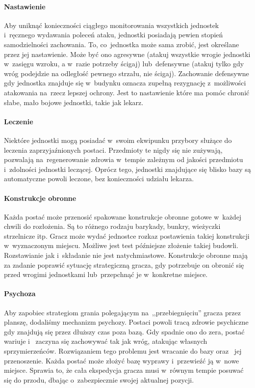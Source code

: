 \documentclass[licencjacka]{pracamgr}
\begin{document}
      \paragraph{Nastawienie}
	Aby uniknąć konieczności ciągłego monitorowania wszystkich jednostek i~ręcznego wydawania poleceń ataku, jednostki posiadają pewien
	stopień samodzielności zachowania. To, co~jednostka może sama zrobić, jest określane przez jej nastawienie. Może być ono agresywne
	(atakuj wszystkie wrogie jednostki w~zasięgu wzroku, a w~razie potrzeby ścigaj) lub~defensywne (atakuj tylko gdy wróg podejdzie na
	odległość pewnego strzału, nie ścigaj). Zachowanie defensywne gdy jednostka znajduje się w~budynku oznacza zupełną rezygnację
	z~możliwości atakowania na~rzecz lepszej ochrony. Jest to nastawienie które ma pomóc chronić słabe, mało bojowe jednostki, takie jak lekarz.
      \paragraph{Leczenie}
	Niektóre jednostki mogą posiadać w~swoim ekwipunku przybory służące do leczenia zaprzyjaźnionych postaci. Przedmioty te nigdy się nie zużywają,
	pozwalają na~regenerowanie zdrowia w~tempie zależnym od jakości przedmiotu i~zdolności jednostki leczącej. Oprócz tego, jednostki znajdujące się
	blisko bazy są automatyczne powoli leczone, bez konieczności udziału lekarza.
      \paragraph{Konstrukcje obronne}
	Każda postać może przenosić spakowane konstrukcje obronne gotowe w~każdej chwili do rozłożenia. Są to różnego rodzaju barykady, bunkry, wieżyczki
	strzelnicze itp. Gracz może wydać jednostce rozkaz postawienia takiej konstrukcji w~wyznaczonym miejscu. Możliwe jest test późniejsze złożenie takiej
	budowli. Rozstawianie jak i~składanie nie jest natychmiastowe. Konstrukcje obronne mają za zadanie poprawić sytuację strategiczną gracza, 
	gdy potrzebuje on obronić się przed wrogimi jednostkami lub~przepchnąć je w~konkretne miejsce.
      \paragraph{Psychoza}
	Aby zapobiec strategiom grania polegającym na~,,przebiegnięciu'' gracza przez planszę, dodaliśmy mechanizm psychozy. Postaci
	powoli tracą zdrowie psychiczne gdy znajdują się przez dłuższy czas poza bazą. Gdy spadnie ono do zera, postać wariuje
	i~ zaczyna się zachowywać tak jak wróg, atakując własnych sprzymierzeńców. Rozwiązaniem tego problemu jest wracanie do bazy oraz~ jej przenoszenie.
	Każda postać może złożyć bazę wyprawy i~przewieźć ją w~nowe miejsce. Sprawia to, że cała ekspedycja gracza musi w~równym tempie posuwać się
	do przodu, dbając o~zabezpiecznie swojej aktualnej pozycji.
\end{document}
